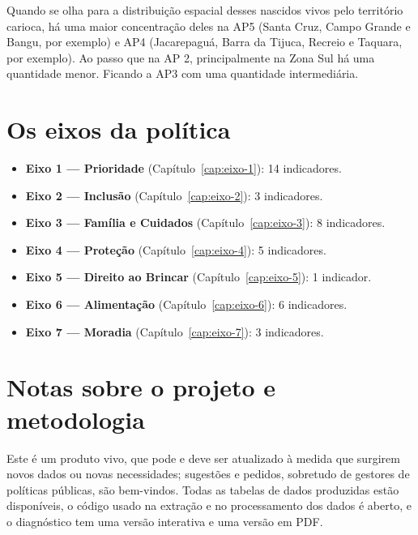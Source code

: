 Quando se olha para a distribuição espacial desses nascidos vivos pelo território carioca, há uma maior concentração deles na AP5 (Santa Cruz, Campo Grande e Bangu, por exemplo) e AP4 (Jacarepaguá, Barra da Tijuca, Recreio e Taquara, por exemplo). Ao passo que na AP 2, principalmente na Zona Sul há uma quantidade menor. Ficando a AP3 com uma quantidade intermediária.


\section{Os eixos da política}

\begin{itemize}

\item \textbf{Eixo 1 --- Prioridade} (Capítulo~\ref{cap:eixo-1}): 14 indicadores.

\item \textbf{Eixo 2 --- Inclusão} (Capítulo~\ref{cap:eixo-2}): 3 indicadores.

\item \textbf{Eixo 3 --- Família e Cuidados} (Capítulo~\ref{cap:eixo-3}): 8 indicadores.

\item \textbf{Eixo 4 --- Proteção} (Capítulo~\ref{cap:eixo-4}): 5 indicadores.

\item \textbf{Eixo 5 --- Direito ao Brincar} (Capítulo~\ref{cap:eixo-5}): 1 indicador.

\item \textbf{Eixo 6 --- Alimentação} (Capítulo~\ref{cap:eixo-6}): 6 indicadores.

\item \textbf{Eixo 7 --- Moradia} (Capítulo~\ref{cap:eixo-7}): 3 indicadores.

\end{itemize}

\section{Notas sobre o projeto e metodologia}\label{sec:notas-metodologia}

Este é um produto vivo, que pode e deve ser atualizado à medida que surgirem novos dados ou novas necessidades; sugestões e pedidos, sobretudo de gestores de políticas públicas, são bem-vindos. Todas as tabelas de dados produzidas estão disponíveis, o código usado na extração e no processamento dos dados é aberto, e o diagnóstico tem uma versão interativa e uma versão em PDF.

